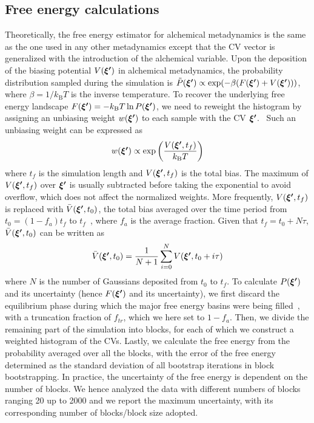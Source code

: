 \documentclass[journal=jacsat,manuscript=article]{achemso}
\newcommand{\bfv}[1]{{\mbox{\boldmath{$#1$}}}}
\begin{document}
\subsection{Free energy calculations}
Theoretically, the free energy estimator for alchemical metadynamics is the same as the one used in any other metadynamics except that the CV vector is generalized with the introduction of the alchemical variable. Upon the deposition of the biasing potential $V(\bfv{\xi'})$ in alchemical metadynamics, the probability distribution sampled during the simulation is $\tilde{P}(\bfv{\xi'}) \propto \exp(-\beta(F(\bfv{\xi'}) + V(\bfv{\xi'})))$, where $\beta=1/k_{\text{B}}T$ is the inverse temperature. To recover the underlying free energy landscape $F(\bfv{\xi'})=-k_{\text{B}}T\ln P(\bfv{\xi'})$, we need to reweight the histogram by assigning an unbiasing weight $w(\bfv{\xi'})$ to each sample with the CV $\bfv{\xi'}$.~\cite{branduardi2012metadynamics} Such an unbiasing weight can be expressed as 
\begin{equation}
    w(\bfv{\xi'}) \propto \exp \left(\frac{V(\bfv{\xi'}, t_f)}{k_{\text{B}}T} \right)
\end{equation} where $t_f$ is the simulation length and $V(\bfv{\xi'}, t_f)$ is the total bias. The maximum of $V(\bfv{\xi'}, t_f)$ over $\bfv{\xi'}$ is usually subtracted before taking the exponential to avoid overflow, which does not affect the normalized weights. More frequently, $V(\bfv{\xi'}, t_f)$ is replaced with $\bar{V}(\bfv{\xi'}, t_0)$, the total bias averaged over the time period from $t_0 = (1-f_a)t_f$ to $t_f$~\cite{micheletti2004reconstructing}, where $f_a$ is the average fraction. Given that $t_f = t_0 + N\tau$, $\bar{V}(\bfv{\xi'}, t_0)$ can be written as 
\begin{equation}
    \bar{V}(\bfv{\xi'}, t_0) = \frac{1}{N+1}\sum_{i=0}^{N}V(\bfv{\xi'}, t_0 + i\tau)
\end{equation}
where $N$ is the number of Gaussians deposited from $t_0$ to $t_f$. To calculate $P(\bfv{\xi'})$ and its uncertainty (hence $F(\bfv{\xi'})$ and its uncertainty), we first discard the equilibrium phase during which the major free energy basins were being filled~\cite{bussi2020using}, with a truncation fraction of $f_{tr}$, which we here set to $1-f_{a}$. Then, we divide the remaining part of the simulation into blocks, for each of which we construct a weighted histogram of the CVs. Lastly, we calculate the free energy from the probability averaged over all the blocks, with the error of the free energy determined as the standard deviation of all bootstrap iterations in block bootstrapping. In practice, the uncertainty of the free energy is dependent on the number of blocks. We hence analyzed the data with different numbers of blocks ranging 20 up to 2000 and we report the maximum uncertainty, with its corresponding number of blocks/block size adopted. 
\end{document}
